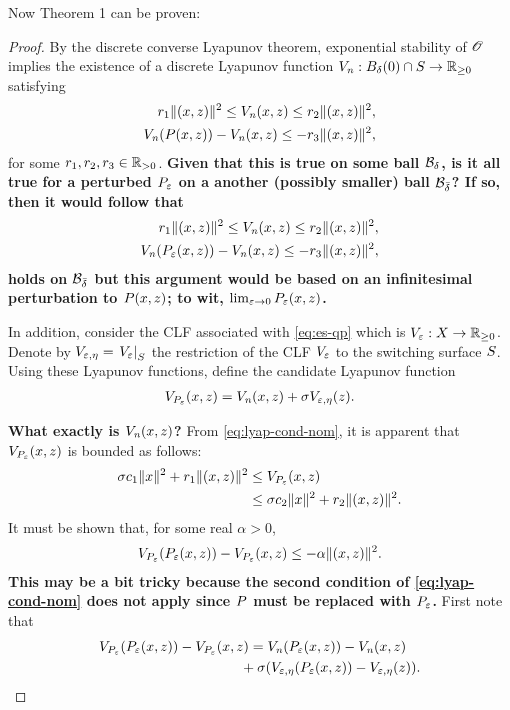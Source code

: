 \documentclass[twocolumn]{article}
\begin{document}
Now Theorem 1 can be proven:
\begin{proof}
  By the discrete converse Lyapunov theorem, exponential stability of $\Orbit$ implies the existence of a discrete Lyapunov function $\Vn : B_{\delta}(0) \cap \S \to \Rnn$ satisfying
  \begin{align}
    \nonumber
    r_{1} \| (\zdx, \zdz) \|^{2} \leq \Vn(\zdx, \zdz) \leq r_{2} \| (\zdx, \zdz) \|^2,\\
    \Vn(\P(\zdx, \zdz)) - \Vn(\zdx, \zdz) \leq -r_{3} \| (\zdx, \zdz) \|^{2},
    \label{eq:lyap-cond-nom}
  \end{align}
  for some $r_{1}, r_{2}, r_{3} \in \Rpd$.
  {\bf Given that this is true on some ball $\B_{\delta}$, is it all true for a perturbed $\Pe$ on a another (possibly smaller) ball $\B_{\bar \delta}$? If so, then it would follow that
  \begin{align}
    \nonumber
    r_{1} \| (\zdx, \zdz) \|^{2} \leq \Vn(\zdx, \zdz) \leq r_{2} \| (\zdx, \zdz) \|^2,\\
    \Vn(\P_{\resclfparam}(\zdx, \zdz)) - \Vn(\zdx, \zdz) \leq -r_{3} \| (\zdx, \zdz) \|^{2},
    \label{eq:lyap-cond-nom}
  \end{align}
  holds on $\B_{\bar \delta}$ but this argument would be based on an infinitesimal perturbation to $P(\zdx, \zdz)$; to wit, $\limeps \Pe(\zdx, \zdz)$.}

  In addition, consider the CLF associated with \eqref{eq:es-qp} which is $\Ve : \zdX \to \Rnn$.
  Denote by $\Vee = \VeS$ the restriction of the CLF $\Ve$ to the switching surface $\S$.
  Using these Lyapunov functions, define the candidate Lyapunov function
  \begin{align}
    \VP(\zdx, \zdz) = \Vn(\zdx, \zdz) + \sigma \Vee(\zdz).
  \end{align}

  {\bf What exactly is $\Vn(\zdx, \zdz)$?}
  From \eqref{eq:lyap-cond-nom}, it is apparent that $\VP(\zdx, \zdz)$ is bounded as follows:
  \begin{align}
    \sigma c_{1} \| \zdx \|^{2} + r_{1} \| (\zdx, \zdz) \|^{2} &\leq \VP(\zdx, \zdz)\\
    \nonumber
    &\leq \sigma c_{2} \| \zdx \|^{2} + r_{2} \| (\zdx, \zdz) \|^{2}.
  \end{align}
  It must be shown that, for some real $\alpha > 0$,
  \begin{align}
    \VP(\Pe(\zdx, \zdz)) - \VP(\zdx, \zdz) \leq -\alpha \| (\zdx, \zdz) \|^{2}.
  \end{align}
      {\bf This may be a bit tricky because the second condition of \eqref{eq:lyap-cond-nom} does not apply since $\P$ must be replaced with $\Pe$.}
  First note that
  \begin{align}
    \lefteqn{\VP(\Pe(\zdx, \zdz)) - \VP(\zdx, \zdz) = \Vn(\Pe(\zdx, \zdz)) - \Vn(\zdx, \zdz)}\\
    \nonumber
    &&\hspace{3.2cm}\mbox{} + \sigma(\Vee(\Pe(\zdx, \zdz)) - \Vee(\zdz)).
  \end{align}


\end{proof}
\end{document}
